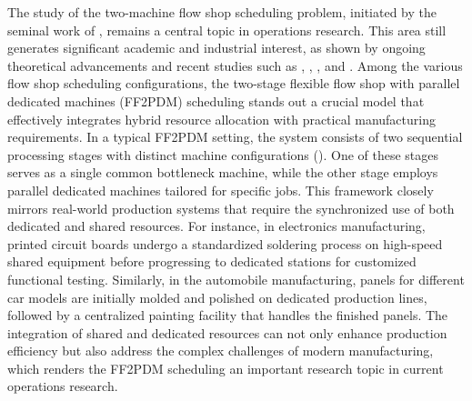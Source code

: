 \documentclass[12pt, eqno, limlimits]{article}
\begin{document}
\begin{sloppypar}
        The study of the two-machine flow shop scheduling problem, initiated by the seminal work of \cite{Johnson1954NRL}, remains a central topic in operations research. This area still generates significant academic and industrial interest, as shown by ongoing theoretical advancements and recent studies such as \cite{DolguiKovalyovLin2022NRL}, \cite{Shabtay2023NRL}, \cite{LvWang2024CIE},  and \cite{Perez-GonzalezFraminan2024EJOR}. Among the various flow shop scheduling configurations, the two-stage flexible flow shop with parallel dedicated machines (FF2PDM) scheduling stands out a crucial model that effectively integrates hybrid resource allocation with practical manufacturing requirements. In a typical FF2PDM setting, the system consists of two sequential processing stages with distinct machine configurations (\citealp{HwangLin2018COR}). One of these stages serves as a single common bottleneck machine, while the other stage employs parallel dedicated machines tailored for specific jobs. This framework closely mirrors real-world production systems that require the synchronized use of both dedicated and shared resources. For instance, in electronics manufacturing, printed circuit boards undergo a standardized soldering process on high-speed shared equipment before progressing to dedicated stations for customized functional testing. Similarly, in the automobile manufacturing, panels for different car models are initially molded and polished on dedicated production lines, followed by a centralized painting facility that handles the finished panels. The integration of shared and dedicated resources can not only enhance production efficiency but also address the complex challenges of modern manufacturing, which renders the FF2PDM scheduling an important research topic in current operations research. 
        

\end{sloppypar}
\end{document}
